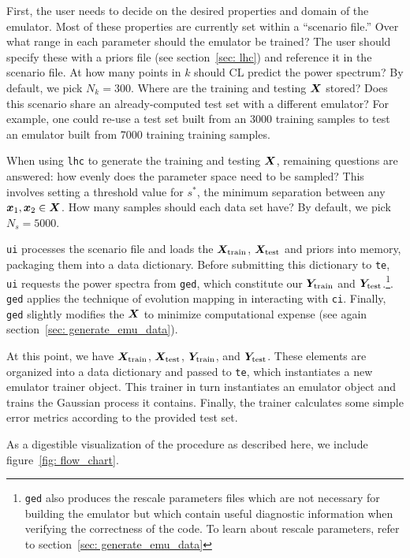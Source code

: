 First, the user needs to decide on the desired properties and domain of the
emulator. Most of these properties are currently set within a ``scenario
file.'' Over what range in each parameter should the emulator be trained?
The user should specify these with a priors file (see section~\ref{sec: lhc}) 
and reference it in the scenario file. At how many points in
$k$ should CL predict the power spectrum? By default, we pick $N_k = 300$. 
Where are the training and testing $\bm{X}$ stored?
Does this scenario share an
already-computed test set with a different emulator? For example, one could
re-use a test set built from an 3000 training samples to test an emulator 
built from 7000 training training samples.

When using \texttt{lhc} to generate the training and testing
$\bm{X}$, remaining questions are answered: how evenly does the parameter
space need to be sampled? This involves setting a threshold value for $s^*$,
the minimum separation between any $\bm{x}_1, \bm{x}_2 \in \bm{X}$.
How many samples should each data set have? By default, we pick $N_s = 5000$.

\texttt{ui} processes the scenario file and loads the
$\bm{X}_\text{train}$, $\bm{X}_\text{test}$
and priors into
memory, packaging them into a data dictionary. Before submitting this
dictionary to \texttt{te}, \texttt{ui} requests the power spectra from
\texttt{ged}, which constitute our $\bm{Y}_\text{train}$ and
$\bm{Y}_\text{test}$.\footnote{\texttt{ged} also 
produces the rescale parameters files which are not
necessary for building the emulator but which contain useful diagnostic
information when verifying the correctness of the code. To learn about rescale
parameters, refer to section~\ref{sec: generate_emu_data}}. \texttt{ged}
applies the technique of evolution mapping in interacting with \texttt{ci}.
Finally, \texttt{ged} slightly modifies the $\bm{X}$ to minimize
computational expense (see again section~\ref{sec: generate_emu_data}). 

At this point, we have $\bm{X}_\text{train}$, $\bm{X}_\text{test}$, 
$\bm{Y}_\text{train}$, and $\bm{Y}_\text{test}$. These elements are
organized into a data dictionary and passed to \texttt{te}, which instantiates
a new emulator trainer object. This trainer in turn instantiates an emulator 
object and trains the Gaussian process it contains. Finally, the trainer 
calculates some simple error metrics according to the provided test set.

As a digestible visualization of the procedure as described here, we
include figure~\ref{fig: flow_chart}.

